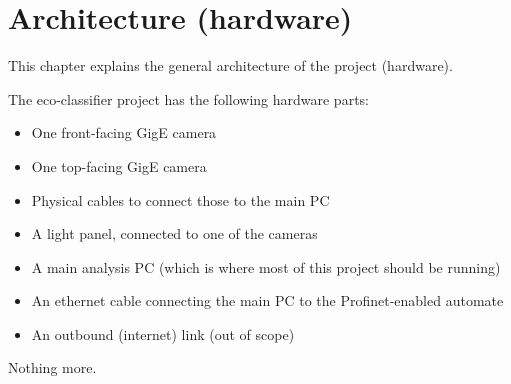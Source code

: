 \chapter{Architecture (hardware)}
\label{chapter:hardwarearchitecture}

This chapter explains the general architecture of the project (hardware).


The eco-classifier project has the following hardware parts:

\begin{itemize}
    \item One front-facing GigE camera
    \item One top-facing GigE camera
    \item Physical cables to connect those to the main PC
    \item A light panel, connected to one of the cameras
    \item A main analysis PC (which is where most of this project should be running)
    \item An ethernet cable connecting the main PC to the Profinet-enabled automate
    \item An outbound (internet) link (out of scope)
\end{itemize}

Nothing more.

